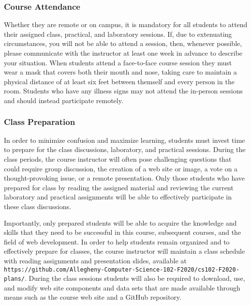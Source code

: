 \documentclass[11pt]{article}
\newcommand{\url}[1]{\lstinline{#1}}
\begin{document}
\vspace*{-.05in}

\subsubsection*{Course Attendance}

Whether they are remote or on campus, it is mandatory for all students to attend
their assigned class, practical, and laboratory sessions. If, due to extenuating
circumstances, you will not be able to attend a session, then, whenever
possible, please communicate with the instructor at least one week in advance to
describe your situation. When students attend a face-to-face course session they
must wear a mask that covers both their mouth and nose, taking care to maintain
a physical distance of at least six feet between themself and every person in
the room. Students who have any illness signs may not attend the in-person
sessions and should instead participate remotely.

\vspace*{-.05in}

\subsubsection*{Class Preparation}

In order to minimize confusion and maximize learning, students must invest time
to prepare for the class discussions, laboratory, and practical sessions. During
the class periods, the course instructor will often pose challenging questions
that could require group discussion, the creation of a web site or image, a vote
on a thought-provoking issue, or a remote presentation. Only those students who
have prepared for class by reading the assigned material and reviewing the
current laboratory and practical assignments will be able to effectively
participate in these class discussions.

Importantly, only prepared students will be able to acquire the knowledge and
skills that they need to be successful in this course, subsequent courses, and
the field of web development. In order to help students remain organized and to
effectively prepare for classes, the course instructor will maintain a class
schedule with reading assignments and presentation slides, available at
\url{https://github.com/Allegheny-Computer-Science-102-F2020/cs102-F2020-plans/}.
During the class sessions students will also be required to download, use, and
modify web site components and data sets that are made available through means
such as the course web site and a GitHub repository.
\end{document}
